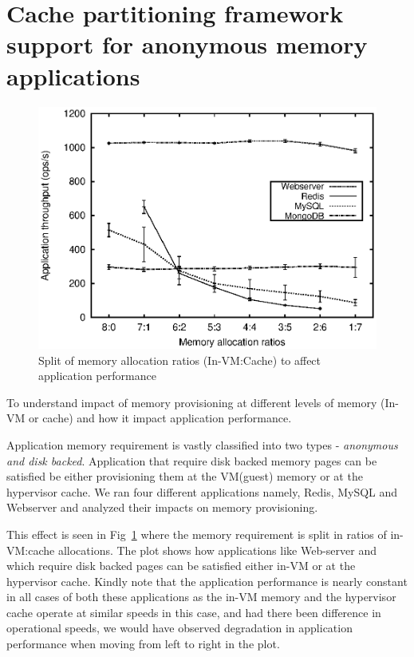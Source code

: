     
    \section{Cache partitioning framework support for anonymous memory applications} 
	
	\begin{figure}
	  \centering
	  \includegraphics[scale=0.8]{images/dd_decentrailze_motivation/throughput.eps}
	  \caption{Split of memory allocation ratios (In-VM:Cache) to affect application performance}
	  \label{plot:dd_decentrailze_motivation}
	\end{figure}
	
	  To understand impact of memory provisioning at different levels of memory (In-VM or cache)
	  and how it impact application performance.
	
	  Application memory requirement is vastly classified into two types - \textit{anonymous and disk backed}.
	  Application that require disk backed memory pages can be satisfied be either provisioning them at the 
	  VM(guest) memory or at the hypervisor cache. We ran four different applications namely, Redis, \mongo{}
	  MySQL and Webserver and analyzed their impacts on memory provisioning.
	  
	  This effect is seen in Fig~\ref{plot:dd_decentrailze_motivation}
	  where the memory requirement is split in ratios of in-VM:cache allocations. The plot shows how applications like
	  Web-server and \mongo{} which require disk backed pages can be satisfied either in-VM or at the hypervisor cache.
	  Kindly note that the application performance is nearly constant in all cases of both these applications as the 
	  in-VM memory and the hypervisor cache operate at similar speeds in this case, and had there been difference in
	  operational speeds, we would have observed degradation in application performance when moving from left to right 
	  in the plot.
	

